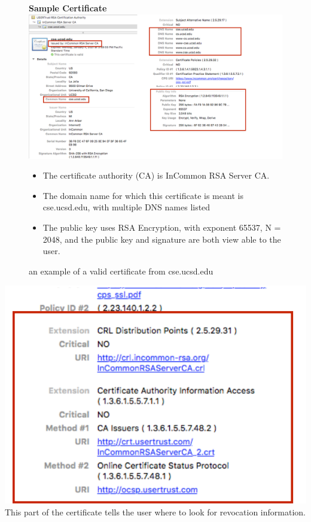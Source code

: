 \documentclass[11pt]{article} %
\begin{document}
\newpage
\begin{figure}
    \centering
    \textbf{Sample Certificate}
    \includegraphics[scale=.4]{./cert1.png}
    \caption{an example of a valid certificate from cse.ucsd.edu}
    \begin{itemize}
      \item  The certificate authority (CA) is InCommon RSA Server CA.
      \item The domain name for which this certificate is meant is cse.ucsd.edu, with multiple DNS names listed
      \item The public key uses RSA Encryption, with exponent 65537, N = 2048, and the public key and signature are both view able to the user.
    \end{itemize}
\end{figure}

\newpage
\includegraphics[scale=.5]{./cert2.png}
This part of the certificate tells the user where to look for revocation information.
\end{document}
